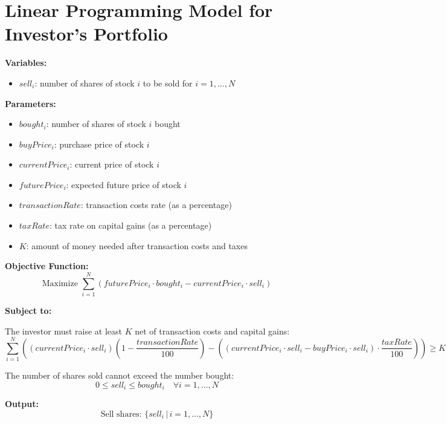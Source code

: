 \documentclass{article}
\begin{document}
\section*{Linear Programming Model for Investor's Portfolio}

\textbf{Variables:}
\begin{itemize}
    \item \( sell_i \): number of shares of stock \( i \) to be sold for \( i = 1, \ldots, N \)
\end{itemize}

\textbf{Parameters:}
\begin{itemize}
    \item \( bought_i \): number of shares of stock \( i \) bought
    \item \( buyPrice_i \): purchase price of stock \( i \)
    \item \( currentPrice_i \): current price of stock \( i \)
    \item \( futurePrice_i \): expected future price of stock \( i \)
    \item \( transactionRate \): transaction costs rate (as a percentage)
    \item \( taxRate \): tax rate on capital gains (as a percentage)
    \item \( K \): amount of money needed after transaction costs and taxes
\end{itemize}

\textbf{Objective Function:}
\[
\text{Maximize } \sum_{i=1}^{N} (futurePrice_i \cdot bought_i - currentPrice_i \cdot sell_i)
\]

\textbf{Subject to:}

The investor must raise at least \( K \) net of transaction costs and capital gains:
\[
\sum_{i=1}^{N} \left( (currentPrice_i \cdot sell_i) \left(1 - \frac{transactionRate}{100}\right) - \left( (currentPrice_i \cdot sell_i - buyPrice_i \cdot sell_i) \cdot \frac{taxRate}{100} \right) \right) \geq K
\]

The number of shares sold cannot exceed the number bought:
\[
0 \leq sell_i \leq bought_i \quad \forall i = 1, \ldots, N
\]

\textbf{Output:}
\[
\text{Sell shares: } \{ sell_i \, | \, i = 1, \ldots, N \}
\]
\end{document}
